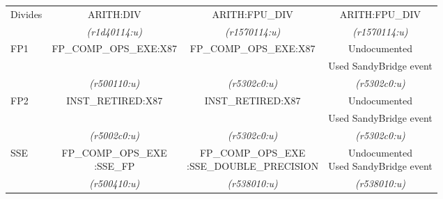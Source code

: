\begin{tabular}{|l||c|c|c|}
\hline
\multirow{2}{*}{\parbox{0.5in}{Divides}} &
ARITH:DIV		& %
ARITH:FPU\_DIV		& %
ARITH:FPU\_DIV		\\ %

                      &
{\em (r1d40114:u)}    & %
{\em (r1570114:u)}    & %
{\em (r1570114:u)}    \\ %


\hline
\multirow{3}{*}{\parbox{0.5in}{FP1}}  &
FP\_COMP\_OPS\_EXE:X87 & %
FP\_COMP\_OPS\_EXE:X87 & %
Undocumented              \\ %

                        &
			&
			&
Used SandyBridge event          \\  %



                      &
{\em (r500110:u)}     & %
{\em (r5302c0:u)}     & %
{\em (r5302c0:u)}     \\ %


\hline
\multirow{3}{*}{\parbox{0.5in}{FP2}}     &  
INST\_RETIRED:X87        & %
INST\_RETIRED:X87        & %
Undocumented                              \\ %

               &  
		&
		&
Used SandyBridge event \\ %



                      &
{\em (r5002c0:u)}     & %
{\em (r5302c0:u)}     & %
{\em (r5302c0:u)}     \\ %


\hline
\multirow{3}{*}{\parbox{0.5in}{SSE}}   & 
\multirow{2}{*}{\parbox{1.2in}{\centering FP\_COMP\_OPS\_EXE\\:SSE\_FP}} & %
\multirow{2}{*}{\parbox{1.4in}{\centering FP\_COMP\_OPS\_EXE\\:SSE\_DOUBLE\_PRECISION}} & %
\multirow{2}{*}{\parbox{1.3in}{\centering Undocumented\\
Used SandyBridge event}}                 \\ %


               &  
		& %
		& %
		\\  %

                      &
{\em (r500410:u)}     & %
{\em (r538010:u)}     & %
{\em (r538010:u)}     \\ %




\end{tabular}
